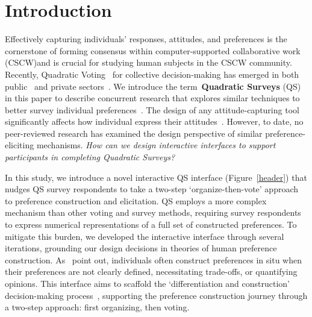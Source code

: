 \section{Introduction}
Effectively capturing individuals' responses, attitudes, and preferences is the cornerstone of forming consensus within computer-supported collaborative work (CSCW)and is crucial for studying human subjects in the CSCW community. Recently, Quadratic Voting~\cite{posner2018radical} for collective decision-making has emerged in both public~\cite{rogersColoradoTriedNew2019, QuadraticVotingColorado, teamTaiwanDigitalMinister} and private sectors~\cite{Gov4gitDecentralizedPlatform2023}. We introduce the term~\textbf{Quadratic Surveys} (QS) in this paper to describe concurrent research that explores similar techniques to better survey individual preferences~\cite{quarfoot2017quadratic, chengCanShowWhat2021}. The design of any attitude-capturing tool significantly affects how individual express their attitudes~\cite{engstrom2020politics, weijtersEffectRatingScale2010, kierujVariationsResponseStyle2010, toepoelSmileysStarsHearts2019, farzandAestheticsEvaluatingResponse2024, xiaoTellMeYourself2020, pielotDidYouMisclick2024}. However, to date, no peer-reviewed research has examined the design perspective of similar preference-eliciting mechanisms. \textit{How can we design interactive interfaces to support participants in completing Quadratic Surveys?}

In this study, we introduce a novel interactive QS interface (Figure~\ref{header}) that nudges QS survey respondents to take a two-step `organize-then-vote' approach to preference construction and elicitation. QS employs a more complex mechanism than other voting and survey methods, requiring survey respondents to express numerical representations of a full set of constructed preferences. To mitigate this burden, we developed the interactive interface through several iterations, grounding our design decisions in theories of human preference construction. As~\textcite{lichtensteinConstructionPreference2006} point out, individuals often construct preferences in situ when their preferences are not clearly defined, necessitating trade-offs, or quantifying opinions. This interface aims to scaffold the `differentiation and construction' decision-making process~\textcite{svensonDifferentiationConsolidationTheory1992}, supporting the preference construction journey through a two-step approach: first organizing, then voting.


